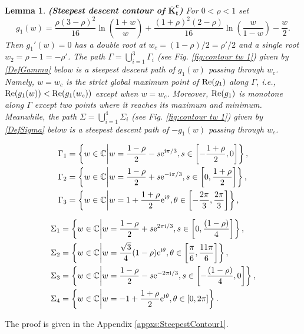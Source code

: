 \documentclass[cmp]{svjour}
\numberwithin{theorem}{section}
\numberwithin{equation}{section}
\def\ii{{\rm i}}
\newtheorem{lemman}[theorem]{Lemma}
\begin{document}
\begin{lemman}
	\label{descent contour 1}
	{\rm \textbf{(Steepest  descent contour of $\boldsymbol{\bar{K}_t^c}$)}}
	For $0<\rho<1$ set 
	\[g_1(w)=\frac{\rho(3-\rho)^2}{16}
	\ln\left(\frac{1+w}{w}\right)+
	\frac{(1+\rho)^2(2-\rho)}{16}
	\ln\left(\frac{w}{1-w}\right)-\frac{w}{2}.\]
	Then $g_1'(w)=0$ has a double root at $w_c=(1-\rho)/2=\rho'/2$ and a single root $w_2=\rho-1=-\rho'$. The path $\Gamma=\bigcup_{i=1}^3 \Gamma_i$ (see Fig. \ref{fig:contour tw 1}) given by \eqref{DefGamma} below is a steepest descent path of $g_1(w)$ passing through $w_c$. Namely, $w=w_c$ is the strict global maximum point of ${\rm Re}(g_1)$ along $\Gamma$, i.e., ${\rm Re}(g_1(w))<{\rm Re}(g_1(w_c))$ except when $w=w_c$. Moreover, ${\rm Re}(g_1)$ is monotone along $\Gamma$ except two points where it reaches its maximum and minimum. Meanwhile, the path $\Sigma=\bigcup_{i=1}^4 \Sigma_i$ (see Fig. \ref{fig:contour tw 1}) given by \eqref{DefSigma} below is a steepest descent path of $-g_1(w)$ passing through $w_c$.
	
	
	
	\begin{subequations}\label{DefGamma}
		\begin{align}
			\Gamma_1 & = \left\{ w \in \mathbb{C} \middle| w = \frac{1 - \rho}{2} - s \mathrm{e}^{\ii \pi / 3} , s \in \left[ - \frac{1 + \rho}{2} , 0 \right] \right\} \label{DefGamma1}, \\
			\Gamma_2 & = \left\{ w \in \mathbb{C} \middle| w = \frac{1 - \rho}{2} + s \mathrm{e}^{-\ii \pi / 3} , s \in \left[ 0, \frac{1 + \rho}{2} \right] \right\} \label{DefGamma2}, \\
			\Gamma_3 & = \left\{ w \in \mathbb{C} \middle| w = 1 + \frac{1 + \rho}{2} \mathrm{e}^{\ii \theta} , \theta \in \left[ - \frac{2 \pi }{3} , \frac{2 \pi }{3} \right] \right\} \label{DefGamma3}, 
		\end{align}
	\end{subequations}
	
	\begin{subequations}\label{DefSigma}
		\begin{align}
			\Sigma_1 & = \left\{ w \in \mathbb{C} \middle| w = \frac{1-\rho}{2} + s \mathrm{e}^{2 \pi \ii /3} , s \in \left[ 0, \frac{(1 - \rho)}{4} \right] \right\} \label{DefSigma1}, \\
			\Sigma_2 & = \left\{ w \in \mathbb{C} \middle| w = \frac{\sqrt{3}}{4}(1 - \rho) \mathrm{e}^{\ii \theta} , \theta \in \left[ \frac{\pi}{6} , \frac{11 \pi}{6} \right] \right\} \label{DefSigma2}, \\
			\Sigma_3 & = \left\{ w \in \mathbb{C} \middle| w = \frac{1-\rho}{2} - s \mathrm{e}^{- 2 \pi \ii /3} , s \in \left[ -\frac{(1 - \rho)}{4} , 0 \right]  \right\} \label{DefSigma3}, \\
			\Sigma_4 & = \left\{ w \in \mathbb{C} \middle| w = -1 + \frac{1 + \rho}{2} \mathrm{e}^{\ii \theta} , \theta \in \left[ 0 , 2 \pi \right] \right\} \label{DefSigma4}.
		\end{align}
	\end{subequations}
	
\end{lemman}
The proof is given in the Appendix \ref{appxs:SteepestContour1}.
\end{document}

